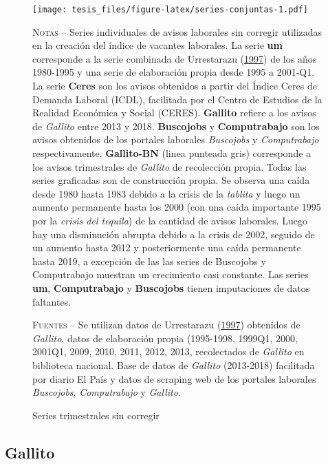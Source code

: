 \documentclass[12pt,oneside]{reedthesis}
\begin{document}
\begin{figure}
\texttt{[image: tesis\_files/figure-latex/series-conjuntas-1.pdf]}
\caption{Series trimestrales sin corregir}\label{fig:series-conjuntas}\textsc{}

\footnotesize\textsc{Notas} -- Series individuales de avisos laborales sin corregir utilizadas en la creación del índice de vacantes laborales. La serie \textbf{um} corresponde a la serie combinada de Urrestarazu (\protect\hyperlink{ref-Urrestarazu1997}{1997}) de los años 1980-1995 y una serie de elaboración propia desde 1995 a 2001-Q1. La serie \textbf{Ceres} son los avisos obtenidos a partir del Índice Ceres de Demanda Laboral (ICDL), facilitada por el Centro de Estudios de la Realidad Económica y Social (CERES). \textbf{Gallito} refiere a los avisos de \textit{Gallito} entre 2013 y 2018. \textbf{Buscojobs} y \textbf{Computrabajo} son los avisos obtenidos de los portales laborales \textit{Buscojobs} y \textit{Computrabajo} respectivamente. \textbf{Gallito-BN} (linea punteada gris) corresponde a los avisos trimestrales de \textit{Gallito} de recolección propia. Todas las series graficadas son de construcción propia. Se observa una caída desde 1980 hasta 1983 debido a la crisis de la \textit{tablita} y luego un aumento permanente hasta los 2000 (con una caída importante 1995 por la \textit{crisis del tequila}) de la cantidad de avisos laborales. Luego hay una disminución abrupta debido a la crisis de 2002, seguido de un aumento hasta 2012 y posteriormente una caída permanente hasta 2019, a excepción de las las series de Buscojobs y Computrabajo muestran un crecimiento casi constante. Las series \textbf{um}, \textbf{Computrabajo} y \textbf{Buscojobs} tienen imputaciones de datos faltantes.

\textsc{Fuentes} -- Se utilizan datos de Urrestarazu (\protect\hyperlink{ref-Urrestarazu1997}{1997}) obtenidos de \textit{Gallito}, datos de elaboración propia (1995-1998, 1999Q1, 2000, 2001Q1, 2009, 2010, 2011, 2012, 2013, recolectados de \textit{Gallito} en biblioteca nacional. Base de datos de \textit{Gallito} (2013-2018) facilitada por diario El País y datos de scraping web de los portales laborales \textit{Buscojobs}, \textit{Computrabajo} y \textit{Gallito}.
\end{figure}
\hypertarget{gallito}{%
\subsection{Gallito}\label{gallito}}
\end{document}

